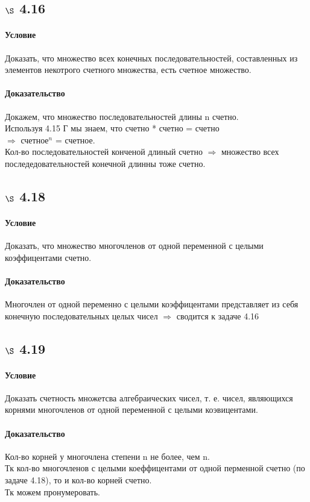 \documentclass[a4paper,12pt]{article}
\begin{document}
\subsection*{$\S$ 4.16}
\paragraph*{Условие}
Доказать, что множество всех конечных последовательностей, составленных из элементов некотрого счетного множества, есть счетное множество.
\paragraph*{Доказательство}
Докажем, что множество последовательностей длины n счетно.\\
Используя 4.15 Г мы знаем, что счетно * счетно = счетно \\
$ \Rightarrow $ счетное$^{n} $ = счетное.\\
Кол-во последовательностей конченой длиный счетно $\Rightarrow$ множество всех последедовательностей конечной длинны тоже счетно.


\subsection*{$\S$ 4.18}
\paragraph*{Условие}
Доказать, что множество многочленов от одной переменной с целыми коэффицентами счетно.
\paragraph*{Доказательство}
Многочлен от одной переменно с целыми коэффицентами представляет из себя конечную последовательных целых чисел $\Rightarrow$ сводится к задаче 4.16

\subsection*{$\S$ 4.19}
\paragraph*{Условие}
Доказать счетность множетсва алгебраических чисел, т. е. чисел, являющихся корнями многочленов от одной переменной с целыми коэвицентами.
\paragraph*{Доказательство}
Кол-во корней у многочлена степени n не более, чем n.\\
Тк кол-во многочленов с целыми коеффицентами от одной перменной счетно (по задаче 4.18), то и кол-во корней счетно.\\
Тк можем пронумеровать.
\end{document}
